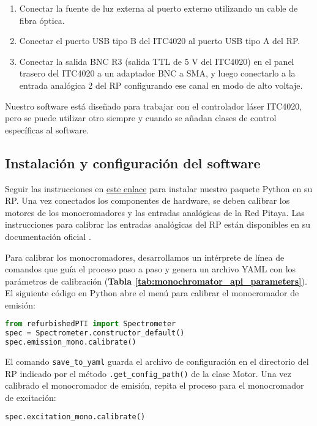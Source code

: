 \begin{enumerate}
    \item Conectar la fuente de luz externa al puerto externo utilizando un cable de fibra óptica.
    \item Conectar el puerto USB tipo B del ITC4020 al puerto USB tipo A del RP.
    \item Conectar la salida BNC R3 (salida TTL de 5 V del ITC4020) en el panel trasero del ITC4020 a un adaptador BNC a SMA, y luego conectarlo a la entrada analógica 2 del RP configurando ese canal en modo de alto voltaje.
\end{enumerate}

Nuestro software está diseñado para trabajar con el controlador láser ITC4020, pero se puede utilizar otro siempre y cuando se añadan clases de control específicas al software.

\subsection{Instalación y configuración del software} 

Seguir las instrucciones en \href{https://github.com/tdinapoli/refurbishedPTI}{este enlace}\cite{napoli_tdinapoli_2024} para instalar nuestro paquete Python en su RP. 
Una vez conectados los componentes de hardware, se deben calibrar los motores de los monocromadores y las entradas analógicas de la Red Pitaya. 
Las instrucciones para calibrar las entradas analógicas del RP están disponibles en su documentación oficial \cite{rp_docs}.

Para calibrar los monocromadores, desarrollamos un intérprete de línea de comandos que guía el proceso paso a paso y genera un archivo YAML con los parámetros de calibración (\textbf{Tabla \ref{tab:monochromator_api_parameters}}). El siguiente código en Python abre el menú para calibrar el monocromador de emisión:

\begin{lstlisting}[language=Python]
from refurbishedPTI import Spectrometer
spec = Spectrometer.constructor_default()
spec.emission_mono.calibrate()
\end{lstlisting}

El comando \texttt{save\_to\_yaml} guarda el archivo de configuración en el directorio del RP indicado por el método \texttt{.get\_config\_path()} de la clase Motor. Una vez calibrado el monocromador de emisión, repita el proceso para el monocromador de excitación:

\begin{lstlisting}[language=Python]
spec.excitation_mono.calibrate()
\end{lstlisting}


